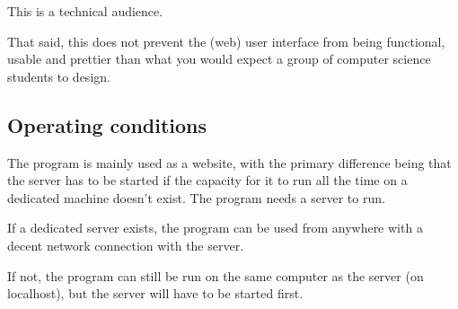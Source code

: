 %   
%   




This is a technical audience.
 
That said, this does not prevent the (web) user interface from being functional,
usable and prettier than what you would expect a group of 
computer science students to design.
 

\subsection{Operating conditions}

The program is mainly used as a website, with the primary difference being
 that the server has to be started if the capacity for it to run 
 all the time on a dedicated machine doesn't exist. 
The program needs a server to run. 

If a dedicated server exists, the program can be used from anywhere
 with a decent network connection with the server.

If not, the program can still be run on the same computer as 
the server (on localhost), but the server will have to be started first.
 

